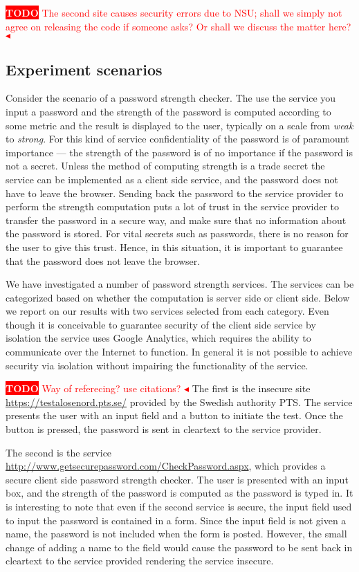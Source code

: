\documentclass{llncs}
\newcommand{\todo}[1]{\colorbox{red}{\textcolor{white}{\sffamily\bfseries\scriptsize TODO}} \textcolor{red}{#1} \textcolor{red}{$\blacktriangleleft$}}
\begin{document}
\todo{The second site causes security errors due to NSU; shall we simply not agree on releasing the code if someone asks? Or shall we discuss the matter here?}

\subsection{Experiment scenarios}

Consider the scenario of a password strength checker. The use the service
you input a password and the strength of the password is computed according
to some metric and the result is displayed to the user, typically on a scale
from \emph{weak} to \emph{strong}.
%
For this kind of service confidentiality of the password is of paramount importance --- 
the strength of the password is of no importance if the password is not a secret.
Unless the method of computing strength is a trade secret the service can be
implemented as a client side service, and the password does not have to leave the
browser. Sending back the password to the service provider to perform
the strength computation puts a lot of trust in the service provider to transfer the
password in a secure way, and make sure that no information about the password
is stored. For vital secrets such as passwords, there is no reason for the user
to give this trust. Hence, in this situation, it is important to guarantee that
the password does not leave the browser.

We have investigated a number of password strength services. The services can
be categorized based on whether the computation is server side or client side.
Below we report on our results with two services selected from each category. 
Even though it is conceivable to guarantee security of the client side service
by isolation the service uses Google Analytics, which requires the ability
to communicate over the Internet to function. In general it is not possible
to achieve security via isolation without impairing the functionality of
the service.

\todo{Way of referecing? use citations?}
The first is the insecure site \url{https://testalosenord.pts.se/} provided by
the Swedish authority PTS. The service presents the user with an input field
and a button to initiate the test. Once the button is pressed, the
password is sent in cleartext to the service provider.

The second is the service
\url{http://www.getsecurepassword.com/CheckPassword.aspx}, which provides a
secure client side password strength checker. The user is presented with an
input box, and the strength of the password is computed as the password
is typed in.
%
It is interesting to note that even if the second service is secure, the input
field used to input the password is contained in a form. Since the input field
is not given a name, the password is not included when the form is posted.
However, the small change of adding a name to the field would cause the
password to be sent back in cleartext to the service provided rendering the
service insecure.
\end{document}
